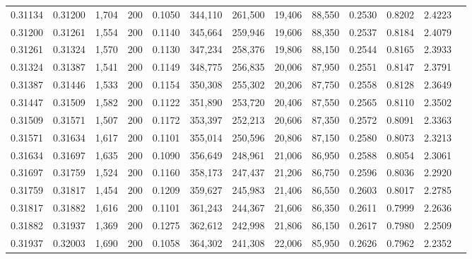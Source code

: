 \begin{tabular}{rrrrrrrrrrrrr}
0.31134 & 0.31200 &  1,704 & 200 &                                     0.1050 & 344,110 & 261,500 &  19,406 &  88,550 & 0.2530 & 0.8202 & 2.4223 \\
0.31200 & 0.31261 &  1,554 & 200 &                                     0.1140 & 345,664 & 259,946 &  19,606 &  88,350 & 0.2537 & 0.8184 & 2.4079 \\
0.31261 & 0.31324 &  1,570 & 200 &                                     0.1130 & 347,234 & 258,376 &  19,806 &  88,150 & 0.2544 & 0.8165 & 2.3933 \\
0.31324 & 0.31387 &  1,541 & 200 &                                     0.1149 & 348,775 & 256,835 &  20,006 &  87,950 & 0.2551 & 0.8147 & 2.3791 \\
0.31387 & 0.31446 &  1,533 & 200 &                                     0.1154 & 350,308 & 255,302 &  20,206 &  87,750 & 0.2558 & 0.8128 & 2.3649 \\
0.31447 & 0.31509 &  1,582 & 200 &                                     0.1122 & 351,890 & 253,720 &  20,406 &  87,550 & 0.2565 & 0.8110 & 2.3502 \\
0.31509 & 0.31571 &  1,507 & 200 &                                     0.1172 & 353,397 & 252,213 &  20,606 &  87,350 & 0.2572 & 0.8091 & 2.3363 \\
0.31571 & 0.31634 &  1,617 & 200 &                                     0.1101 & 355,014 & 250,596 &  20,806 &  87,150 & 0.2580 & 0.8073 & 2.3213 \\
0.31634 & 0.31697 &  1,635 & 200 &                                     0.1090 & 356,649 & 248,961 &  21,006 &  86,950 & 0.2588 & 0.8054 & 2.3061 \\
0.31697 & 0.31759 &  1,524 & 200 &                                     0.1160 & 358,173 & 247,437 &  21,206 &  86,750 & 0.2596 & 0.8036 & 2.2920 \\
0.31759 & 0.31817 &  1,454 & 200 &                                     0.1209 & 359,627 & 245,983 &  21,406 &  86,550 & 0.2603 & 0.8017 & 2.2785 \\
0.31817 & 0.31882 &  1,616 & 200 &                                     0.1101 & 361,243 & 244,367 &  21,606 &  86,350 & 0.2611 & 0.7999 & 2.2636 \\
0.31882 & 0.31937 &  1,369 & 200 &                                     0.1275 & 362,612 & 242,998 &  21,806 &  86,150 & 0.2617 & 0.7980 & 2.2509 \\
0.31937 & 0.32003 &  1,690 & 200 &                                     0.1058 & 364,302 & 241,308 &  22,006 &  85,950 & 0.2626 & 0.7962 & 2.2352 \\

\end{tabular}
